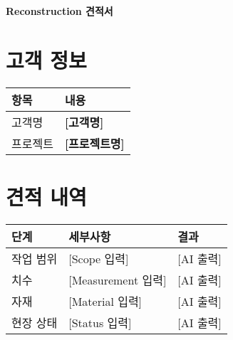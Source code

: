 \documentclass{article}
\begin{document}
\begin{center}
    \textbf{Reconstruction 견적서}
\end{center}

\section*{고객 정보}
\begin{tabularx}{\textwidth}{l X}
    \toprule
    항목 & 내용 \\
    \midrule
    고객명 & \textbf{[고객명]} \\
    프로젝트 & \textbf{[프로젝트명]} \\
    \bottomrule
\end{tabularx}

\section*{견적 내역}
\begin{tabularx}{\textwidth}{l X l}
    \toprule
    단계 & 세부사항 & 결과 \\
    \midrule
    작업 범위 & [Scope 입력] & [AI 출력] \\
    치수 & [Measurement 입력] & [AI 출력] \\
    자재 & [Material 입력] & [AI 출력] \\
    현장 상태 & [Status 입력] & [AI 출력] \\
    \bottomrule
\end{tabularx}
\end{document}
